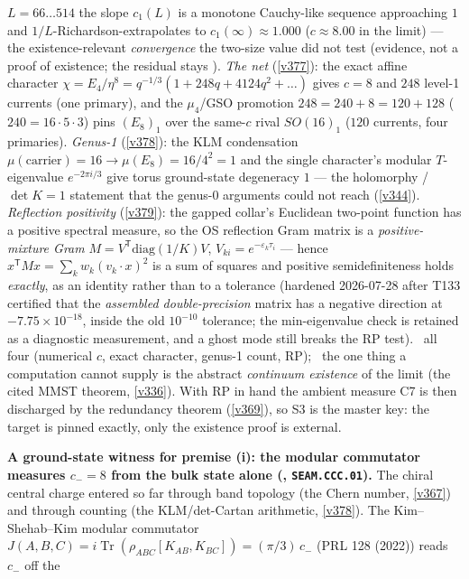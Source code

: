 \documentclass[11pt,a4paper]{article}
\begin{document}
\begin{keybox}
$L=66\ldots514$ the slope $c_1(L)$ is a monotone Cauchy-like sequence approaching $1$ and $1/L$-Richardson-extrapolates
to $c_1(\infty)\approx1.000$ ($c\approx8.00$ in the limit) --- the existence-relevant \emph{convergence} the two-size
value did not test (evidence, not a proof of existence; the residual stays \mO). \emph{The net} (\vref{v377}): the exact affine character
$\chi=E_4/\eta^8=q^{-1/3}(1+248q+4124q^2+\dots)$ gives $c=8$ and $248$ level-1 currents (one primary), and
the $\mu_4$/GSO promotion $248{=}240{+}8{=}120{+}128$ ($240{=}16{\cdot}5{\cdot}3$) pins $(E_8)_1$ over the
same-$c$ rival $SO(16)_1$ ($120$ currents, four primaries). \emph{Genus-1} (\vref{v378}): the KLM
condensation $\mu(\text{carrier}){=}16\to\mu(E_8){=}16/4^2{=}1$ and the single character's modular
$T$-eigenvalue $e^{-2\pi i/3}$ give torus ground-state degeneracy $1$ --- the holomorphy / $\det K{=}1$
statement that the genus-0 arguments could not reach (\vref{v344}). \emph{Reflection positivity}
(\vref{v379}): the gapped collar's Euclidean two-point function has a positive spectral measure, so the OS
reflection Gram matrix is a \emph{positive-mixture Gram}
$M=V^{\mathsf T}\mathrm{diag}(1/K)V$, $V_{ki}=e^{-\varepsilon_k\tau_i}$ --- hence
$x^{\mathsf T}Mx=\sum_kw_k(v_k\!\cdot\!x)^2$ is a sum of squares and positive semidefiniteness holds
\emph{exactly}, as an identity rather than to a tolerance (hardened 2026-07-28 after T133 certified that
the \emph{assembled double-precision} matrix has a negative direction at $-7.75\times10^{-18}$, inside the
old $10^{-10}$ tolerance; the min-eigenvalue check is retained as a diagnostic measurement, and a ghost
mode still breaks the RP test). \mE\ all four (numerical $c$,
exact character, genus-1 count, RP); \mO\ the one thing a computation cannot supply is the abstract
\emph{continuum existence} of the limit (the cited MMST theorem, \vref{v336}). With RP in hand the ambient
measure C7 is then discharged by the redundancy theorem (\vref{v369}), so S3 is the master key: the target
is pinned exactly, only the existence proof is external.
\par\smallskip\noindent\textbf{A ground-state witness for premise (i): the modular commutator measures
$c_-{=}8$ from the bulk state alone (, \texttt{SEAM.CCC.01}).}
The chiral central charge entered so far through band topology (the Chern number, \vref{v367}) and through
counting (the KLM/det-Cartan arithmetic, \vref{v378}). The Kim--Shehab--Kim modular commutator
$J(A,B,C)=i\operatorname{Tr}(\rho_{ABC}[K_{AB},K_{BC}])=(\pi/3)\,c_-$ (PRL 128 (2022)) reads $c_-$ off the

\end{keybox}
\end{document}
